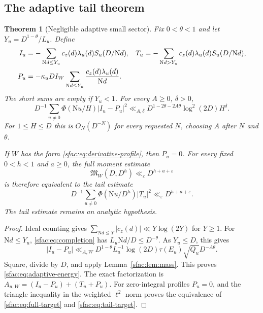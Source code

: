 \documentclass[11pt]{article}
\numberwithin{equation}{section}
\newtheorem{theorem}{Theorem}[section]
\theoremstyle{definition}
\theoremstyle{remark}
\newcommand{\N}{\mathrm N}
\begin{document}
\subsection{The adaptive tail theorem}

\begin{theorem}[Negligible adaptive small sector]
\label{sfac:thm:adaptive}
Fix $0<\theta<1$ and let $Y_u=D^{1-\theta}/L_u$.  Define
\begin{align}
 I_u&=-\sum_{\N d\le Y_u}c_z(d)\lambda_u(d)S_u(D/\N d),
 &T_u&=-\sum_{\N d>Y_u}c_z(d)\lambda_u(d)S_u(D/\N d),\notag\\
 P_u&=-\kappa_uDI_W
       \sum_{\N d\le Y_u}\frac{c_z(d)\lambda_u(d)}{\N d}.
 \label{sfac:eq:adaptive-sums}
\end{align}
The short sums are empty if $Y_u<1$.  For every $A\ge0$, $\delta>0$,
\begin{equation}
 D^{-1}\sum_{u\ne0}\Phi(\N u/H)|I_u-P_u|^2
  \ll_{A,\delta}D^{1-2\theta-2A\theta}\log^2(2D)H^\delta.
 \label{sfac:eq:adaptive-energy}
\end{equation}
For $1\le H\le D$ this is $O_N(D^{-N})$ for every requested $N$,
choosing $A$ after $N$ and $\theta$.

If $W$ has the form \eqref{sfac:eq:derivative-profile}, then $P_u=0$.
For every fixed $0<h<1$ and $a\ge0$, the full moment estimate
\begin{equation}
 \mathfrak M_W(D,D^h)\ll_\varepsilon D^{h+a+\varepsilon}
 \label{sfac:eq:full-target}
\end{equation}
is therefore equivalent to the tail estimate
\begin{equation}
 D^{-1}\sum_{u\ne0}\Phi(\N u/D^h)|T_u|^2
       \ll_\varepsilon D^{h+a+\varepsilon}.
 \label{sfac:eq:tail-target}
\end{equation}
The tail estimate remains an analytic hypothesis.
\end{theorem}

\begin{proof}
Ideal counting gives $\sum_{\N d\le Y}|c_z(d)|\ll Y\log(2Y)$ for
$Y\ge1$.  For $\N d\le Y_u$, \eqref{sfac:eq:completion} has
$L_u\N d/D\le D^{-\theta}$.  As $Y_u\le D$, this gives
\[
 |I_u-P_u|\ll_{A,W}
 D^{1-\theta}L_u^{-1}\log(2D)
       \tau(E_u)\sqrt{Q_u}D^{-A\theta}.
\]
Square, divide by $D$, and apply Lemma~\ref{sfac:lem:mass}.
This proves \eqref{sfac:eq:adaptive-energy}.  The exact factorization
is $A_{u,W}=(I_u-P_u)+(T_u+P_u)$.  For zero-integral profiles $P_u=0$,
and the triangle inequality in the weighted $\ell^2$ norm proves the
equivalence of \eqref{sfac:eq:full-target} and \eqref{sfac:eq:tail-target}.
\end{proof}
\end{document}
